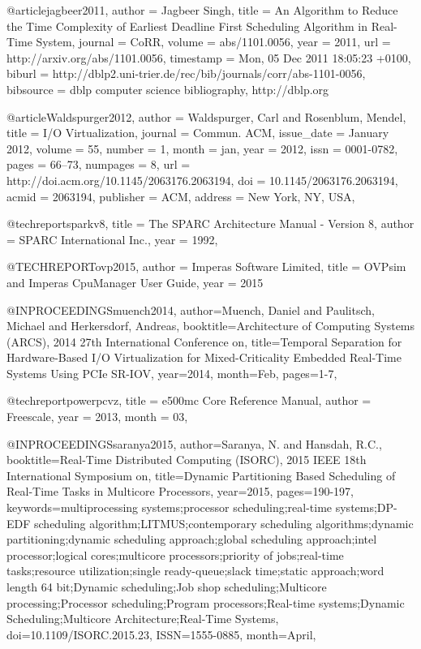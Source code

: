 @article{jagbeer2011,
  author    = {Jagbeer Singh},
  title     = {An Algorithm to Reduce the Time Complexity of Earliest Deadline First
               Scheduling Algorithm in Real-Time System},
  journal   = {CoRR},
  volume    = {abs/1101.0056},
  year      = {2011},
  url       = {http://arxiv.org/abs/1101.0056},
  timestamp = {Mon, 05 Dec 2011 18:05:23 +0100},
  biburl    = {http://dblp2.uni-trier.de/rec/bib/journals/corr/abs-1101-0056},
  bibsource = {dblp computer science bibliography, http://dblp.org}
}

@article{Waldspurger2012,
 author = {Waldspurger, Carl and Rosenblum, Mendel},
 title = {I/O Virtualization},
 journal = {Commun. ACM},
 issue_date = {January 2012},
 volume = {55},
 number = {1},
 month = jan,
 year = {2012},
 issn = {0001-0782},
 pages = {66--73},
 numpages = {8},
 url = {http://doi.acm.org/10.1145/2063176.2063194},
 doi = {10.1145/2063176.2063194},
 acmid = {2063194},
 publisher = {ACM},
 address = {New York, NY, USA},
} 

@techreport{sparkv8,
     title = {{The SPARC Architecture Manual - Version 8}},
     author = {{SPARC International Inc.}},
     year = {1992},
}

@TECHREPORT{ovp2015,
    author = {{Imperas Software Limited}},
    title = {OVPsim and Imperas CpuManager User Guide},
    year = {2015}
}

@INPROCEEDINGS{muench2014, 
author={Muench, Daniel and Paulitsch, Michael and Herkersdorf, Andreas}, 
booktitle={Architecture of Computing Systems (ARCS), 2014 27th International Conference on}, 
title={Temporal Separation for Hardware-Based I/O Virtualization for Mixed-Criticality Embedded Real-Time Systems Using PCIe SR-IOV}, 
year={2014}, 
month={Feb}, 
pages={1-7},}

@techreport{powerpcvz,
     title = {{e500mc Core Reference Manual}},
     author = {{Freescale}},
     year = {2013},
     month = {03},
}

@INPROCEEDINGS{saranya2015, 
author={Saranya, N. and Hansdah, R.C.}, 
booktitle={Real-Time Distributed Computing (ISORC), 2015 IEEE 18th International Symposium on}, 
title={Dynamic Partitioning Based Scheduling of Real-Time Tasks in Multicore Processors}, 
year={2015}, 
pages={190-197}, 
keywords={multiprocessing systems;processor scheduling;real-time systems;DP-EDF scheduling algorithm;LITMUS;contemporary scheduling algorithms;dynamic partitioning;dynamic scheduling approach;global scheduling approach;intel processor;logical cores;multicore processors;priority of jobs;real-time tasks;resource utilization;single ready-queue;slack time;static approach;word length 64 bit;Dynamic scheduling;Job shop scheduling;Multicore processing;Processor scheduling;Program processors;Real-time systems;Dynamic Scheduling;Multicore Architecture;Real-Time Systems}, 
doi={10.1109/ISORC.2015.23}, 
ISSN={1555-0885}, 
month={April},}

